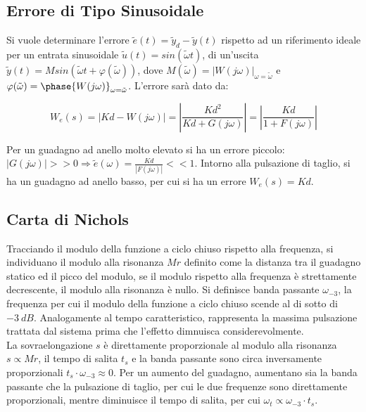 \documentclass{article}
\numberwithin{equation}{subsection}
\begin{document}
\subsection{Errore di Tipo Sinusoidale}

Si vuole determinare l'errore $\tilde{e}(t)=\tilde{y}_d-\tilde{y}(t)$ rispetto ad un riferimento ideale per un entrata sinusoidale $\tilde{u}(t)=sin(\tilde{\omega}t)$, di un'uscita 
$\tilde{y}(t)=Msin(\tilde{\omega}t+{\varphi}(\tilde{\omega}))$, dove $M(\tilde{\omega})=|W(j\omega)|_{\omega=\tilde{\omega}}$ e 
$\varphi(\tilde{\omega})=\phase{W(j\omega)}_{\omega=\tilde{\omega}}$. 
L'errore sarà dato da:

\begin{equation}
    W_e(s)=|Kd-W(j\omega)|=\left|\displaystyle\frac{Kd^2}{Kd+G(j\omega)}\right|=\left|\frac{Kd}{1+F(j\omega)}\right|
\end{equation}

Per un guadagno ad anello molto elevato si ha un errore piccolo: 
$|G(j\omega)|>>0\Rightarrow \tilde{e}(\omega)=\frac{Kd}{|F(j\omega)|}<<1$. Intorno alla pulsazione di taglio, si ha un guadagno ad anello basso, per cui si ha un errore 
$W_e(s)=Kd$. \\

\subsection{Carta di Nichols}

Tracciando il modulo della funzione a ciclo chiuso rispetto alla frequenza, si individuano il modulo alla risonanza $Mr$ definito come la distanza tra il guadagno statico 
ed il picco del modulo, se il modulo rispetto alla frequenza è strettamente decrescente, il modulo alla risonanza è nullo. Si definisce banda passante $\omega_{-3}$, la 
frequenza per cui il modulo della funzione a ciclo chiuso scende al di sotto di $-3\:dB$. Analogamente al tempo caratteristico, rappresenta la massima pulsazione trattata dal 
sistema prima che l'effetto dimnuisca considerevolmente. \\
La sovraelongazione $s$ è direttamente proporzionale al modulo alla risonanza $s\propto Mr$, il tempo di salita $t_s$ e la banda passante sono circa inversamente proporzionali 
$t_s\cdot\omega_{-3}\approx0$. Per un aumento del guadagno, aumentano sia la banda passante che la pulsazione di taglio, per cui le due frequenze sono direttamente proporzionali, 
mentre diminuisce il tempo di salita, per cui $\omega_t\propto\omega_{-3}\cdot t_s$. \\
\end{document}
